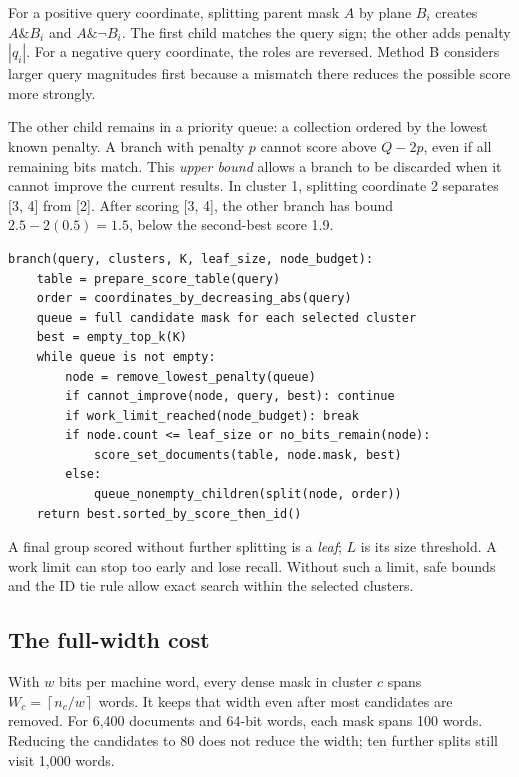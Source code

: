 \documentclass[11pt,a4paper]{article}
\newcommand{\ceil}[1]{\left\lceil #1\right\rceil}
\begin{document}
For a positive query coordinate, splitting parent mask $A$ by plane $B_i$ creates
$A\mathbin{\&}B_i$ and $A\mathbin{\&}\neg B_i$. The first child matches the query sign;
the other adds penalty $|q_i|$. For a negative query coordinate, the roles are reversed.
Method B considers larger query magnitudes first because a mismatch there reduces the
possible score more strongly.

The other child remains in a priority queue: a collection ordered by the lowest known
penalty. A branch with penalty $p$ cannot score above $Q-2p$, even if all remaining bits
match. This \emph{upper bound} allows a branch to be discarded when it cannot improve the
current results. In cluster 1, splitting coordinate 2 separates [3, 4] from [2]. After scoring
[3, 4], the other branch has bound $2.5-2(0.5)=1.5$, below the second-best score 1.9.

\begin{lstlisting}[caption={Method B: preserve alternatives and discard only justified branches.}]
branch(query, clusters, K, leaf_size, node_budget):
    table = prepare_score_table(query)
    order = coordinates_by_decreasing_abs(query)
    queue = full candidate mask for each selected cluster
    best = empty_top_k(K)
    while queue is not empty:
        node = remove_lowest_penalty(queue)
        if cannot_improve(node, query, best): continue
        if work_limit_reached(node_budget): break
        if node.count <= leaf_size or no_bits_remain(node):
            score_set_documents(table, node.mask, best)
        else:
            queue_nonempty_children(split(node, order))
    return best.sorted_by_score_then_id()
\end{lstlisting}

A final group scored without further splitting is a \emph{leaf}; $L$ is its size threshold.
A work limit can stop too early and lose recall. Without such a limit, safe bounds and the
ID tie rule allow exact search within the selected clusters.

\subsection{The full-width cost}
With $w$ bits per machine word, every dense mask in cluster $c$ spans
$W_c=\ceil{n_c/w}$ words. It keeps that width even after most candidates are removed.
For 6,400 documents and 64-bit words, each mask spans 100 words. Reducing the candidates to
80 does not reduce the width; ten further splits still visit 1,000 words.
\end{document}
